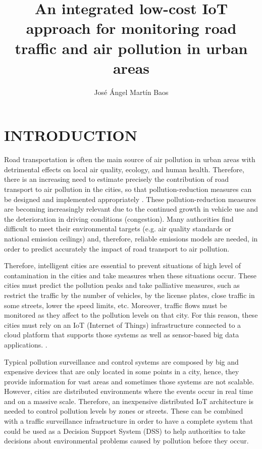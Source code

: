 \documentclass{pre-tfg}
\title{An integrated low-cost IoT approach for monitoring road traffic and air pollution in urban areas}
\author{José Ángel Martín Baos}
\begin{document}
\maketitle
\tableofcontents

\newpage


\section{INTRODUCTION}

Road transportation is often the main source of air pollution in urban areas with detrimental effects on local air quality, ecology, and human health. Therefore, there is an increasing need to estimate precisely the contribution of road transport to air pollution in the cities, so that pollution-reduction measures can be designed and implemented appropriately \cite{SNB10}. These pollution-reduction measures are becoming increasingly relevant due to the continued growth in vehicle use and the deterioration in driving conditions (congestion). Many authorities find difficult to meet their environmental targets (e.g. air quality standards or national emission ceilings) and, therefore, reliable emissions models are needed, in order to predict accurately the impact of road transport to air pollution.

Therefore, intelligent cities are essential to prevent situations of high level of contamination in the cities and take measures when these situations occur. These cities must predict the pollution peaks and take palliative measures, such as restrict the traffic by the number of vehicles, by the license plates, close traffic in some streets, lower the speed limits, etc. Moreover, traffic flows must be monitored as they affect to the pollution levels on that city. For this reason, these cities must rely on an IoT (Internet of Things) infrastructure connected to a cloud platform that supports those systems as well as sensor-based big data applications. \cite{Bib18}.



Typical pollution surveillance and control systems are composed by big and expensive devices that are only located in some points in a city, hence, they provide information for vast areas and sometimes those systems are not scalable. However, cities are distributed environments where the events occur in real time and on a massive scale. Therefore, an inexpensive distributed IoT architecture is needed to control pollution levels by zones or streets. These can be combined with a traffic surveillance infrastructure in order to have a complete system that could be used as a Decision Support System (DSS) to help authorities to take decisions about environmental problems caused by pollution before they occur.
\end{document}
